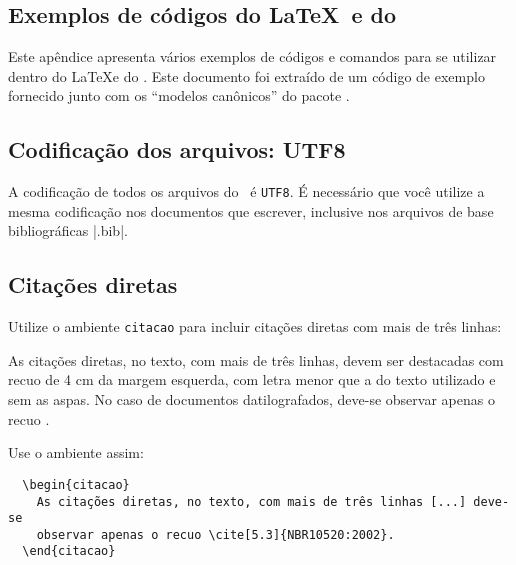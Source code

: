 \documentclass[article,12pt,oneside,a4paper,chapter=TITLE,
			   english,brazil]{abntex2}
\begin{document}
\begin{anexosenv}


\newpage
\chapter{Exemplos de códigos do \LaTeX\ e do \abnTeX}
\label{exemplos}

Este apêndice apresenta vários exemplos de códigos e comandos para se utilizar dentro do \LaTeX e do \abnTeX. Este documento foi extraído de um código de exemplo fornecido junto com os ``modelos canônicos'' do pacote \abnTeX.

\section{Codificação dos arquivos: UTF8}

A codificação de todos os arquivos do \abnTeX\ é \texttt{UTF8}. É necessário que você utilize a mesma codificação nos documentos que escrever, inclusive nos arquivos de base bibliográficas |.bib|.

\section{Citações diretas}
\label{sec-citacao}

Utilize o ambiente \texttt{citacao} para incluir citações diretas com mais de três linhas:
\begin{citacao}
  As citações diretas, no texto, com mais de três linhas, devem ser destacadas com recuo de 4 cm da margem esquerda, com letra menor que a do texto utilizado e sem as aspas. No caso de documentos datilografados, deve-se observar apenas o recuo \cite[5.3]{NBR10520:2002}.
\end{citacao}

Use o ambiente assim:
\begin{verbatim}
  \begin{citacao}
    As citações diretas, no texto, com mais de três linhas [...] deve-se
    observar apenas o recuo \cite[5.3]{NBR10520:2002}.
  \end{citacao}
\end{verbatim}


\end{anexosenv}
\end{document}
